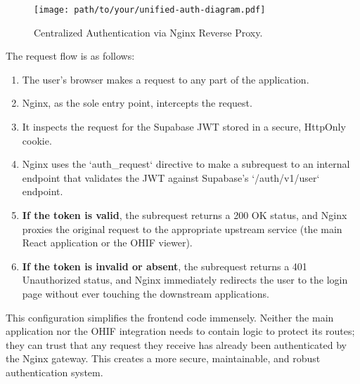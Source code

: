 \begin{figure}[h]
    \centering
    \texttt{[image: path/to/your/unified-auth-diagram.pdf]}
    \caption{Centralized Authentication via Nginx Reverse Proxy.}
    \label{fig:unified_auth}
\end{figure}

The request flow is as follows:
\begin{enumerate}
    \item The user's browser makes a request to any part of the application.
    \item Nginx, as the sole entry point, intercepts the request.
    \item It inspects the request for the Supabase JWT stored in a secure, HttpOnly cookie.
    \item Nginx uses the `auth_request` directive to make a subrequest to an internal endpoint that validates the JWT against Supabase's `/auth/v1/user` endpoint.
    \item \textbf{If the token is valid}, the subrequest returns a 200 OK status, and Nginx proxies the original request to the appropriate upstream service (the main React application or the OHIF viewer).
    \item \textbf{If the token is invalid or absent}, the subrequest returns a 401 Unauthorized status, and Nginx immediately redirects the user to the login page without ever touching the downstream applications.
\end{enumerate}
This configuration simplifies the frontend code immensely. Neither the main application nor the OHIF integration needs to contain logic to protect its routes; they can trust that any request they receive has already been authenticated by the Nginx gateway. This creates a more secure, maintainable, and robust authentication system.
